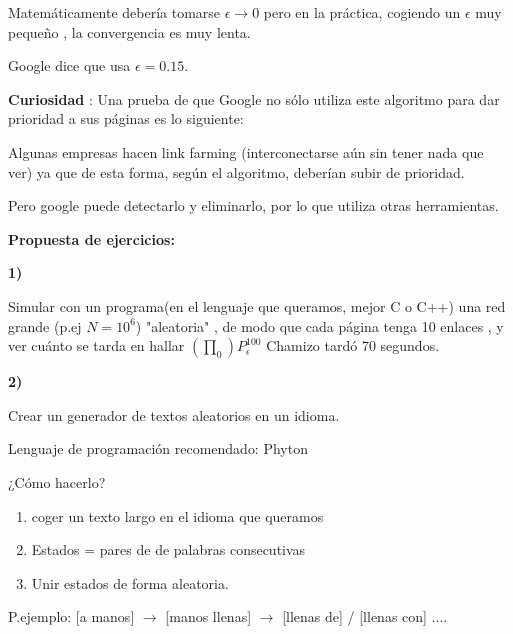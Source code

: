 Matemáticamente debería tomarse $\epsilon\rightarrow 0$ pero en la práctica, cogiendo un $\epsilon$ muy pequeño , la convergencia es muy lenta.

Google dice que usa $\epsilon = 0.15$.

\textbf{Curiosidad} : Una prueba de que Google no sólo utiliza este algoritmo para dar prioridad a sus páginas es lo siguiente:

Algunas empresas hacen link farming (interconectarse aún sin tener nada que ver) ya que de esta forma, según el algoritmo, deberían subir de prioridad.

\begin{center}


\end{center}

Pero google puede detectarlo y eliminarlo, por lo que utiliza otras herramientas.



\textbf{Propuesta de ejercicios:}

\textbf{1)}


	Simular con un programa(en el lenguaje que queramos, mejor C o C++) una red grande (p.ej $N= 10^6$) "aleatoria" , de modo que cada página tenga 10 enlaces , y ver cuánto se tarda en hallar $(\prod_0) P_{\epsilon}^{100}$
	Chamizo tardó 70 segundos.



\textbf{2)}


	Crear un generador de textos aleatorios en un idioma.
	
	Lenguaje de programación recomendado: Phyton
	
	¿Cómo hacerlo?
	\begin{enumerate}
		\item coger un texto largo en el idioma que queramos
		\item Estados = pares de de palabras consecutivas
		\item Unir estados de forma aleatoria.
	\end{enumerate}
	P.ejemplo: [a manos] $\rightarrow$ [manos llenas] $\rightarrow$ [llenas de] / [llenas con] ....
